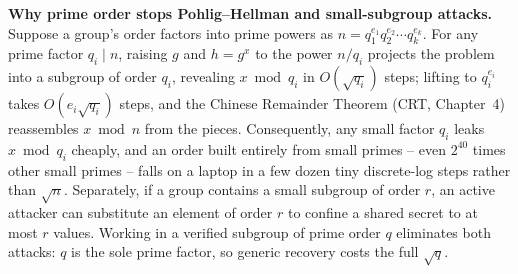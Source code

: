 \begin{focusbox}
\textbf{Why prime order stops Pohlig--Hellman and small-subgroup attacks.} Suppose a group's order factors into prime powers as $n = q_1^{e_1} q_2^{e_2} \cdots q_k^{e_k}$. For any prime factor $q_i \mid n$, raising $g$ and $h = g^x$ to the power $n / q_i$ projects the problem into a subgroup of order $q_i$, revealing $x \bmod q_i$ in $O(\sqrt{q_i})$ steps; lifting to $q_i^{e_i}$ takes $O(e_i \sqrt{q_i})$ steps, and the Chinese Remainder Theorem (CRT, Chapter~4) reassembles $x \bmod n$ from the pieces. Consequently, any small factor $q_i$ leaks $x \bmod q_i$ cheaply, and an order built entirely from small primes -- even $2^{40}$ times other small primes -- falls on a laptop in a few dozen tiny discrete-log steps rather than $\sqrt{n}$. Separately, if a group contains a small subgroup of order $r$, an active attacker can substitute an element of order $r$ to confine a shared secret to at most $r$ values. Working in a verified subgroup of prime order $q$ eliminates both attacks: $q$ is the sole prime factor, so generic recovery costs the full $\sqrt{q}$.
\end{focusbox}

